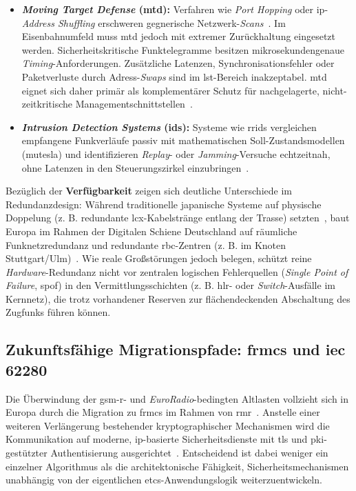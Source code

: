 \documentclass[runningheads]{res/llncs}
\begin{document}
\begin{itemize}
    \item \textbf{\textit{Moving Target Defense} (\gls{mtd}):} Verfahren wie \textit{Port Hopping} oder \gls{ip}-\textit{Address Shuffling} erschweren gegnerische Netzwerk-\textit{Scans}~\parencite[S. 121]{poschingerOpenMTD2020}. Im Eisenbahnumfeld muss \gls{mtd} jedoch mit extremer Zurückhaltung eingesetzt werden. Sicherheitskritische Funktelegramme besitzen mikrosekundengenaue \textit{Timing}-Anforderungen. Zusätzliche Latenzen, Synchronisationsfehler oder Paketverluste durch Adress-\textit{Swaps} sind im \gls{lst}-Bereich inakzeptabel. \gls{mtd} eignet sich daher primär als komplementärer Schutz für nachgelagerte, nicht-zeitkritische Managementschnittstellen~\parencite[S. 121]{poschingerOpenMTD2020}.
    \item \textbf{\textit{Intrusion Detection Systems} (\gls{ids}):} Systeme wie \gls{rrids} vergleichen empfangene Funkverläufe passiv mit mathematischen Soll-Zustandsmodellen (\gls{mutesla}) und identifizieren \textit{Replay}- oder \textit{Jamming}-Versuche echtzeitnah, ohne Latenzen in den Steuerungszirkel einzubringen~\parencite[S. 60--63]{melaragnoRail2016}.
\end{itemize}

Bezüglich der \textbf{Verfügbarkeit} zeigen sich deutliche Unterschiede im Redundanzdesign: Während traditionelle japanische Systeme auf physische Doppelung (z. B. redundante \gls{lcx}-Kabelstränge entlang der Trasse) setzten~\parencite[S. 14--15]{xiangliuCyber2020}, baut Europa im Rahmen der Digitalen Schiene Deutschland auf räumliche Funknetzredundanz und redundante \gls{rbc}-Zentren (z. B. im Knoten Stuttgart/Ulm)~\parencite[S. 89--90, 211]{trinckaufETCS2024}. Wie reale Großstörungen jedoch belegen, schützt reine \textit{Hardware}-Redundanz nicht vor zentralen logischen Fehlerquellen (\textit{Single Point of Failure}, \gls{spof}) in den Vermittlungsschichten (z. B. \gls{hlr}- oder \textit{Switch}-Ausfälle im Kernnetz), die trotz vorhandener Reserven zur flächendeckenden Abschaltung des Zugfunks führen können.

\subsection{\texorpdfstring{Zukunftsfähige Migrationspfade: \gls{frmcs} und \gls{iec} 62280}{Zukunftsfähige Migrationspfade: FRMCS und IEC 62280}}
\label{sec:Zukunftsfähige_Migrationspfade_FRMCS_und_IEC_62280}
Die Überwindung der \gls{gsm-r}- und \textit{EuroRadio}-bedingten Altlasten vollzieht sich in Europa durch die Migration zu \gls{frmcs} im Rahmen von \gls{rmr}~\parencite[S. 49, 123]{trinckaufETCS2024}. Anstelle einer weiteren Verlängerung bestehender kryptographischer Mechanismen wird die Kommunikation auf moderne, \gls{ip}-basierte Sicherheitsdienste mit \gls{tls} und \gls{pki}-gestützter Authentisierung ausgerichtet~\parencite[S. 105, 211]{trinckaufETCS2024}. Entscheidend ist dabei weniger ein einzelner Algorithmus als die architektonische Fähigkeit, Sicherheitsmechanismen unabhängig von der eigentlichen \gls{etcs}-Anwendungslogik weiterzuentwickeln.
\end{document}
